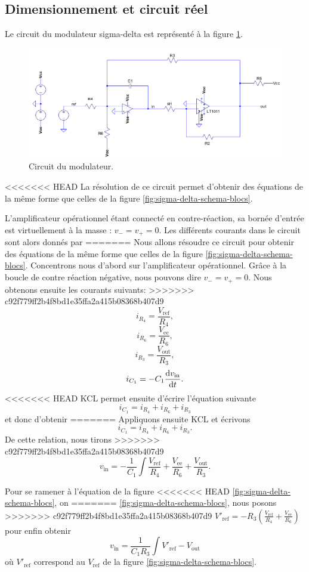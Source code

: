 \subsection{Dimensionnement et circuit réel}
Le circuit du modulateur sigma-delta est représenté
à la figure \ref{fig:sigma-delta-circuit}.

\begin{figure}[ht]
	\centering
	\includegraphics[scale=0.7]{img/sigma-delta-circuit.png}
	\caption{Circuit du modulateur.}
	\label{fig:sigma-delta-circuit}
\end{figure}

<<<<<<< HEAD
La résolution de ce circuit permet d'obtenir des équations
de la même forme que celles de la figure
\ref{fig:sigma-delta-schema-blocs}.

L'amplificateur opérationnel étant connecté en contre-réaction,
sa bornée d'entrée est virtuellement à la masse : $v_- = v_+ = 0$.
Les différents courants dans le circuit sont alors donnés par
=======
Nous allons résoudre ce circuit pour obtenir des équations
de la même forme que celles de la figure
\ref{fig:sigma-delta-schema-blocs}.
Concentrons nous d'abord sur l'amplificateur
opérationnel. Grâce à la boucle de contre
réaction négative, nous pouvons dire $v_- = v_+ = 0$.
Nous obtenons ensuite  les courants suivants:
>>>>>>> c92f779ff2b4f8bd1e35ffa2a415b08368b407d9
\[ i_{R_4} = \frac{V_{\text{ref}}}{R_4},\]
\[ i_{R_6} = \frac{V_{\text{ee}}}{R_6},\]
\[ i_{R_3} = \frac{V_{\text{out}}}{R_3},\]
\[ i_{C_1} = -C_1\frac{\operatorname{d}\! v_{\text{in}}}{\operatorname{d}\! t}.\]
<<<<<<< HEAD
KCL permet ensuite d'écrire l'équation suivante
\[ i_{C_1} = i_{R_4} + i_{R_6} + i_{R_3}\]
et donc d'obtenir
=======
Appliquons ensuite KCL et  écrivons
\[ i_{C_1} = i_{R_4} + i_{R_6} + i_{R_3}.\]
De cette relation, nous tirons
>>>>>>> c92f779ff2b4f8bd1e35ffa2a415b08368b407d9
\[ v_{\text{in}} = -\frac{1}{C_1}\int \frac{V_{\text{ref}}}{R_4}
+ \frac{V_{\text{ee}}}{R_6} + \frac{V_{\text{out}}}{R_3}.\]

Pour se ramener à l'équation de la figure
<<<<<<< HEAD
\ref{fig:sigma-delta-schema-blocs}, on
=======
\ref{fig:sigma-delta-schema-blocs}, nous posons
>>>>>>> c92f779ff2b4f8bd1e35ffa2a415b08368b407d9
$V'_{\text{ref}} = -R_3(\frac{V_{\text{ref}}}{R_4}+\frac{V_{\text{ee}}}{R_6})$
pour enfin obtenir
\[ v_{\text{in}} = \frac{1}{C_1R_3} \int V'_{\text{ref}} - V_{\text{out}}\]
où $V'_{\text{ref}}$ correspond au $V_{\text{ref}}$
de la figure \ref{fig:sigma-delta-schema-blocs}.

